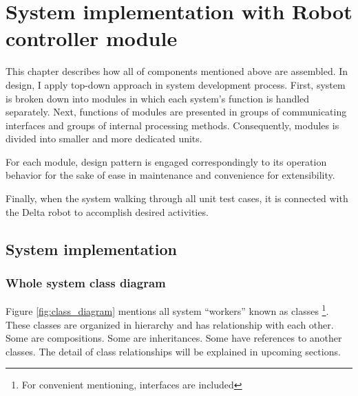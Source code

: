 \chapter{System implementation with Robot controller module}
\indent This chapter describes how all of components mentioned above are assembled. In design, I apply top-down approach in system development process. First, system is broken down into modules in which each system's function is handled separately. Next, functions of modules are presented in groups of communicating interfaces and groups of internal processing methods. Consequently, modules is divided into smaller and more dedicated units.

For each module, design pattern is engaged correspondingly to its operation behavior for the sake of ease in maintenance and convenience for extensibility.

Finally, when the system walking through all unit test cases, it is connected with the Delta robot to accomplish desired activities.

\section{System implementation}
\subsection{Whole system class diagram}
Figure \ref{fig:class_diagram} mentions all system ``workers'' known as classes \footnote{For convenient mentioning, interfaces are included}. These classes are organized in hierarchy and has relationship with each other. Some are compositions. Some are inheritances. Some have references to another classes. The detail of class relationships will be explained in upcoming sections.

